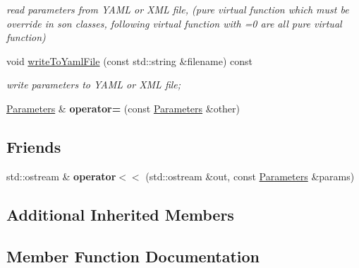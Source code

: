 \begin{DoxyCompactItemize}
\begin{DoxyCompactList}\small\item\em read parameters from Y\+A\+ML or X\+ML file, (pure virtual function which must be override in son classes, following virtual function with \textquotesingle{}=0\textquotesingle{} are all pure virtual function) \end{DoxyCompactList}\item 
void \hyperlink{classcamodocal_1_1EquidistantCamera_1_1Parameters_afb2ad6884187c2b5e9f70f3e54e30321}{write\+To\+Yaml\+File} (const std\+::string \&filename) const
\begin{DoxyCompactList}\small\item\em write parameters to Y\+A\+ML or X\+ML file; \end{DoxyCompactList}\item 
\mbox{\label{classcamodocal_1_1EquidistantCamera_1_1Parameters_ac025131ed2959721df7b8b7358c7fdaf}} 
\hyperlink{classcamodocal_1_1EquidistantCamera_1_1Parameters}{Parameters} \& {\bfseries operator=} (const \hyperlink{classcamodocal_1_1EquidistantCamera_1_1Parameters}{Parameters} \&other)
\end{DoxyCompactItemize}
\subsection*{Friends}
\begin{DoxyCompactItemize}
\item 
\mbox{\label{classcamodocal_1_1EquidistantCamera_1_1Parameters_a392b64d625819770f4efedc75838cc42}} 
std\+::ostream \& {\bfseries operator$<$$<$} (std\+::ostream \&out, const \hyperlink{classcamodocal_1_1EquidistantCamera_1_1Parameters}{Parameters} \&params)
\end{DoxyCompactItemize}
\subsection*{Additional Inherited Members}


\subsection{Member Function Documentation}
\mbox{\label{classcamodocal_1_1EquidistantCamera_1_1Parameters_a66d75d7cc90bd65120ca10914b38b935}} 
